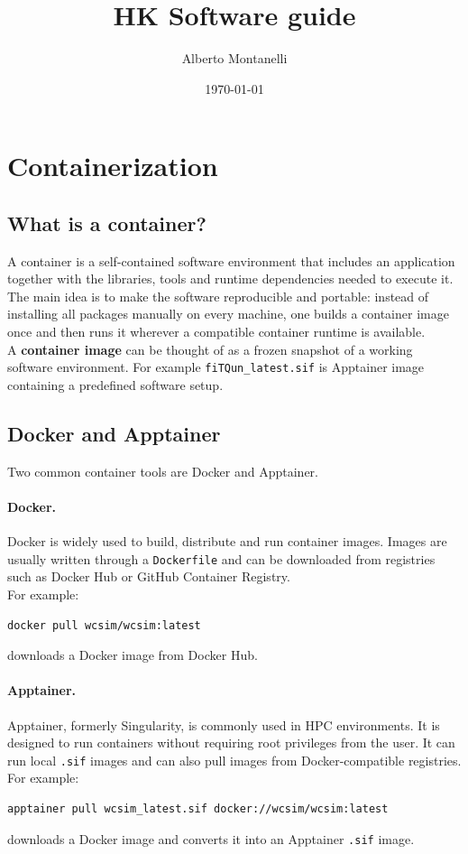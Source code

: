 \documentclass{article}
\title{HK Software guide}
\author{Alberto Montanelli}
\date{\today}
\numberwithin{table}{subsection}
\numberwithin{figure}{subsection}
\numberwithin{equation}{subsection}
\numberwithin{footnote}{subsection}
\begin{document}
\maketitle
{\hypersetup{linkcolor=black}
\tableofcontents
}
\newpage
\section{Containerization}

\subsection{What is a container?}

A container is a self-contained software environment that includes an application
together with the libraries, tools and runtime dependencies needed to execute it.
The main idea is to make the software reproducible and portable: instead of
installing all packages manually on every machine, one builds a container image
once and then runs it wherever a compatible container runtime is available.\\
\newline
A \textbf{container image} can be thought of as a frozen snapshot of a working software
environment. For example \texttt{fiTQun\_latest.sif}
is Apptainer image containing a predefined software setup.

\subsection{Docker and Apptainer}

Two common container tools are Docker and Apptainer.

\paragraph{Docker.}
Docker is widely used to build, distribute and run container images. Images are
usually written through a \texttt{Dockerfile} and can be downloaded from
registries such as Docker Hub or GitHub Container Registry.\\
For example:
\begin{lstlisting}[style=terminal]
docker pull wcsim/wcsim:latest
\end{lstlisting}
downloads a Docker image from Docker Hub.

\paragraph{Apptainer.}
Apptainer, formerly Singularity, is commonly used in HPC environments. It is
designed to run containers without requiring root privileges from the user. It
can run local \texttt{.sif} images and can also pull images from Docker-compatible
registries.\\
For example:
\begin{lstlisting}[style=terminal]
apptainer pull wcsim_latest.sif docker://wcsim/wcsim:latest
\end{lstlisting}
downloads a Docker image and converts it into an Apptainer \texttt{.sif} image.
\end{document}
